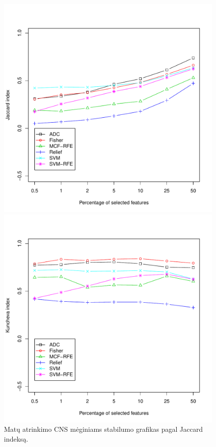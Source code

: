 \begin{figure}[H]
\begin{minipage}[b]{0.5\linewidth}
\label{fig:robk_cns}
\end{minipage}
\hspace{0.2cm}
\begin{minipage}[b]{0.5\linewidth}
\centering
\includegraphics[width=.85\textwidth]{../bachelor/images/nncns_robustness_jaccard.pdf}
\caption{Matų atrinkimo CNS mėginiams stabilumo grafikas pagal Jaccard indeksą.}
\label{fig:robj_cns}
\end{minipage}
\hspace{0.2cm}
\begin{minipage}[b]{0.5\linewidth}
\centering
\includegraphics[width=.85\textwidth]{../bachelor/images/prostate_robustness_kuncheva.pdf}

\end{minipage}
\end{figure}
